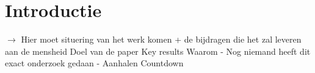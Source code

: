 \documentclass[Main.tex]{subfiles}
\begin{document}
\section{Introductie}

$\rightarrow$ Hier moet situering van het werk komen + de bijdragen die het zal leveren aan de mensheid
Doel van de paper
Key results
Waarom
 - Nog niemand heeft dit exact onderzoek gedaan
 - Aanhalen Countdown
\end{document}
